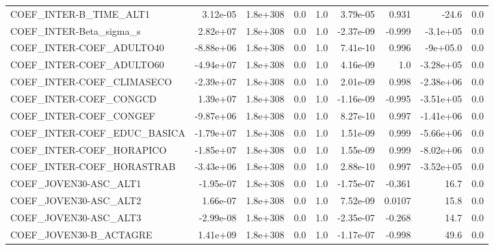 \begin{tabular}{lrrrrrrrr}
COEF\_INTER-B\_TIME\_ALT1            &    3.12e-05 &     1.8e+308 &     0.0 &      1.0 &   3.79e-05 &       0.931 &        -24.6 &           0.0 \\
COEF\_INTER-Beta\_sigma\_s           &    2.82e+07 &     1.8e+308 &     0.0 &      1.0 &  -2.37e-09 &      -0.999 &     -3.1e+05 &           0.0 \\
COEF\_INTER-COEF\_ADULTO40          &   -8.88e+06 &     1.8e+308 &     0.0 &      1.0 &   7.41e-10 &       0.996 &     -9e+05.0 &           0.0 \\
COEF\_INTER-COEF\_ADULTO60          &   -4.94e+07 &     1.8e+308 &     0.0 &      1.0 &   4.16e-09 &         1.0 &    -3.28e+05 &           0.0 \\
COEF\_INTER-COEF\_CLIMASECO         &   -2.39e+07 &     1.8e+308 &     0.0 &      1.0 &   2.01e-09 &       0.998 &    -2.38e+06 &           0.0 \\
COEF\_INTER-COEF\_CONGCD            &    1.39e+07 &     1.8e+308 &     0.0 &      1.0 &  -1.16e-09 &      -0.995 &    -3.51e+05 &           0.0 \\
COEF\_INTER-COEF\_CONGEF            &   -9.87e+06 &     1.8e+308 &     0.0 &      1.0 &   8.27e-10 &       0.997 &    -1.41e+06 &           0.0 \\
COEF\_INTER-COEF\_EDUC\_BASICA       &   -1.79e+07 &     1.8e+308 &     0.0 &      1.0 &   1.51e-09 &       0.999 &    -5.66e+06 &           0.0 \\
COEF\_INTER-COEF\_HORAPICO          &   -1.85e+07 &     1.8e+308 &     0.0 &      1.0 &   1.55e-09 &       0.999 &    -8.02e+06 &           0.0 \\
COEF\_INTER-COEF\_HORASTRAB         &   -3.43e+06 &     1.8e+308 &     0.0 &      1.0 &   2.88e-10 &       0.997 &    -3.52e+05 &           0.0 \\
COEF\_JOVEN30-ASC\_ALT1             &   -1.95e-07 &     1.8e+308 &     0.0 &      1.0 &  -1.75e-07 &      -0.361 &         16.7 &           0.0 \\
COEF\_JOVEN30-ASC\_ALT2             &    1.66e-07 &     1.8e+308 &     0.0 &      1.0 &   7.52e-09 &      0.0107 &         15.8 &           0.0 \\
COEF\_JOVEN30-ASC\_ALT3             &   -2.99e-08 &     1.8e+308 &     0.0 &      1.0 &  -2.35e-07 &      -0.268 &         14.7 &           0.0 \\
COEF\_JOVEN30-B\_ACTAGRE            &    1.41e+09 &     1.8e+308 &     0.0 &      1.0 &  -1.17e-07 &      -0.998 &         49.6 &           0.0 \\

\end{tabular}
